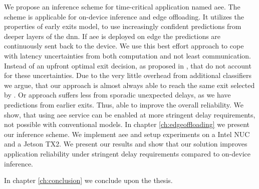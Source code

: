 We propose an inference scheme for time-critical application named \gls{aee}. The scheme is applicable for on-device inference and edge offloading. It utilizes the properties of early exits model, to use increasingly confident predictions from deeper layers of the \gls{dnn}. If \gls{aee} is deployed on edge the predictions are continuously sent back to the device. We use this best effort approach to cope with latency uncertainties from both computation and not least communication. Instead of an upfront optimal exit decision, as proposed in \cite{li_edge_2018}, that do not account for these uncertainties. Due to the very little overhead from additional classifiers we argue, that our approach is almost always able to reach the same exit selected by \cite{li_edge_2018}. Or approach suffers less from sporadic unexpected delays, as we have predictions from earlier exits. Thus, able to improve the overall reliability. We show, that using \gls{aee} service can be enabled at more stringent delay requirements, not possible with conventional models. In chapter \ref{ch:edgeoffloading} we present our inference scheme. We implement \gls{aee} and setup experiments on a Intel NUC and a Jetson TX2. We present our results and show that our solution improves application reliability under stringent delay requirements compared to on-device inference.

In chapter \ref{ch:conclusion} we conclude upon the thesis.